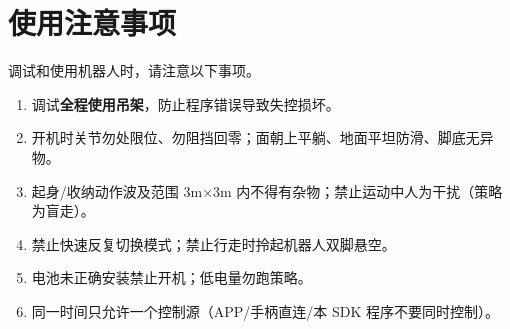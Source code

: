 \chapter{使用注意事项}
调试和使用机器人时，请注意以下事项。


\begin{enumerate}
\item 调试\textbf{全程使用吊架}，防止程序错误导致失控损坏。
\item 开机时关节勿处限位、勿阻挡回零；面朝上平躺、地面平坦防滑、脚底无异物。
\item 起身/收纳动作波及范围 3m$\times$3m 内不得有杂物；禁止运动中人为干扰（策略为盲走）。
\item 禁止快速反复切换模式；禁止行走时拎起机器人双脚悬空。
\item 电池未正确安装禁止开机；低电量勿跑策略。
\item 同一时间只允许一个控制源（APP/手柄直连/本 SDK 程序不要同时控制）。

\end{enumerate}
